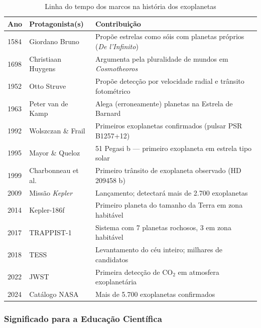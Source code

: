 \documentclass[
	12pt,
	openany,
	oneside,
	a4paper,
	english,
	brazil
]{abntex2}
\begin{document}
\begin{table}[htb]
\caption{\label{tab:timeline_exoplanetas}Linha do tempo dos marcos na história dos exoplanetas}
\begin{tabular}{p{1.5cm}|p{3.5cm}|p{8.5cm}}
  \toprule
  \textbf{Ano} & \textbf{Protagonista(s)} & \textbf{Contribuição} \\
  \midrule
  1584 & Giordano Bruno & Propõe estrelas como sóis com planetas próprios (\textit{De l'Infinito}) \\
  \midrule
  1698 & Christiaan Huygens & Argumenta pela pluralidade de mundos em \textit{Cosmotheoros} \\
  \midrule
  1952 & Otto Struve & Propõe detecção por velocidade radial e trânsito fotométrico \\
  \midrule
  1963 & Peter van de Kamp & Alega (erroneamente) planetas na Estrela de Barnard \\
  \midrule
  1992 & Wolszczan \& Frail & Primeiros exoplanetas confirmados (pulsar PSR B1257+12) \\
  \midrule
  1995 & Mayor \& Queloz & 51 Pegasi b --- primeiro exoplaneta em estrela tipo solar \\
  \midrule
  1999 & Charbonneau et al. & Primeiro trânsito de exoplaneta observado (HD 209458 b) \\
  \midrule
  2009 & Missão \textit{Kepler} & Lançamento; detectará mais de 2.700 exoplanetas \\
  \midrule
  2014 & Kepler-186f & Primeiro planeta do tamanho da Terra em zona habitável \\
  \midrule
  2017 & TRAPPIST-1 & Sistema com 7 planetas rochosos, 3 em zona habitável \\
  \midrule
  2018 & TESS & Levantamento do céu inteiro; milhares de candidatos \\
  \midrule
  2022 & JWST & Primeira detecção de CO$_2$ em atmosfera exoplanetária \\
  \midrule
  2024 & Catálogo NASA & Mais de 5.700 exoplanetas confirmados \\
  \bottomrule
\end{tabular}
\end{table}

\subsubsection{Significado para a Educação Científica}
\end{document}
